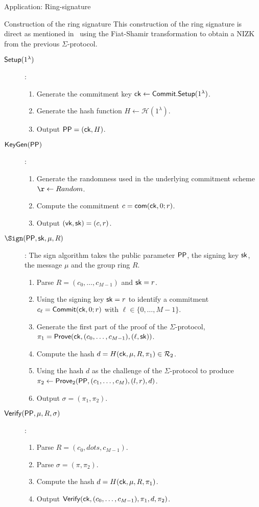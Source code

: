 \begin{section}{Application: Ring-signature}
\begin{subsection}{Construction of the ring signature}
    This construction of the ring signature is direct as mentioned in~\cite{DBLP:conf/eurocrypt/GrothK15} using the Fiat-Shamir transformation to obtain a NIZK from the previous $\Sigma$-protocol.
    \begin{description}
      \item [${\mathsf{Setup}}(1^\lambda)$]:
      \begin{enumerate}
        \item Generate the commitment key $\mathsf{ck} \gets {\mathsf{Commit}}.{\mathsf{Setup}}(1^\lambda)$.
        \item Generate the hash function $H \gets \mathcal{H}(1^\lambda)$.
        \item Output ${\mathsf{PP}} = (\mathsf{ck}, H)$.
      \end{enumerate}
      \item [${\mathsf{KeyGen}}({\mathsf{PP}})$]:
      \begin{enumerate}
        \item Generate the randomness used in the underlying commitment scheme $\r \gets Random$.
        \item Compute the commitment $c = \mathsf{com}(\mathsf{ck}, 0; r)$.
        \item Output $(\mathsf{vk}, \mathsf{sk}) = (c, r)$.
      \end{enumerate}
      \item [$\Sign(\PPP, \sk, \mu, R)$]: The sign algorithm takes the public parameter ${\mathsf{PP}}$, the signing key $\mathsf{sk}$, the message $\mu$ and the group ring $R$.
      \begin{enumerate}
        \item Parse $R = (c_0, \dots, c_{M-1})$ and $\mathsf{sk} = r$.
        \item Using the signing key $\mathsf{sk} = r$ to identify a commitment $c_{\ell} = {\mathsf{Commit}}(\mathsf{ck}, 0; r)$ with $\ell \in \{0, \dots, M-1\}$.
        \item Generate the first part of the proof of the $\Sigma$-protocol, $\pi_1 = {\mathsf{Prove}}(\mathsf{ck}, (c_0, \dots, c_{M-1}), (\ell, \mathsf{sk}))$.
        \item Compute the hash $d = H(\mathsf{ck}, \mu, R, \pi_1) \in {\mathcal{R}}_2$.
        \item Using the hash $d$ as the challenge of the $\Sigma$-protocol to produce $\pi_2 \gets {\mathsf{Prove}}_2({\mathsf{PP}}, (c_1, \dots, c_M), (l, r), d)$.
        \item Output $\sigma = (\pi_1, \pi_2)$.
      \end{enumerate}
      \item [${\mathsf{Verify}}({\mathsf{PP}}, \mu, R, \sigma)$]:
      \begin{enumerate}
        \item Parse $R = (c_0, dots, c_{M-1})$.
        \item Parse $\sigma = (\pi, \pi_2)$.
        \item Compute the hash $d = H(\mathsf{ck}, \mu, R, \pi_1)$.
        \item Output ${\mathsf{Verify}} (\mathsf{ck}, (c_0, \dots, c_{M-1}), \pi_1, d, \pi_2)$.
      \end{enumerate}
    \end{description}


\end{subsection}
\end{section}
